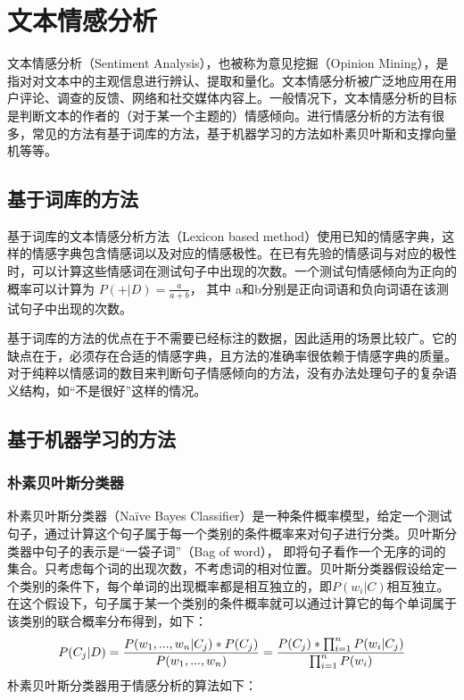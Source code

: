 \chapter{文本情感分析}
文本情感分析（Sentiment Analysis），也被称为意见挖掘（Opinion Mining），是指对对文本中的主观信息进行辨认、提取和量化。文本情感分析被广泛地应用在用户评论、调查的反馈、网络和社交媒体内容上。一般情况下，文本情感分析的目标是判断文本的作者的（对于某一个主题的）情感倾向。进行情感分析的方法有很多，常见的方法有基于词库的方法，基于机器学习的方法如朴素贝叶斯和支撑向量机等等。

\section{基于词库的方法}
基于词库的文本情感分析方法（Lexicon based method）使用已知的情感字典，这样的情感字典包含情感词以及对应的情感极性。在已有先验的情感词与对应的极性时，可以计算这些情感词在测试句子中出现的次数。一个测试句情感倾向为正向的概率可以计算为 $P(+|D)=\frac{a}{a+b}$， 其中 a和b分别是正向词语和负向词语在该测试句子中出现的次数。

基于词库的方法的优点在于不需要已经标注的数据，因此适用的场景比较广。它的缺点在于，必须存在合适的情感字典，且方法的准确率很依赖于情感字典的质量。对于纯粹以情感词的数目来判断句子情感倾向的方法，没有办法处理句子的复杂语义结构，如“不是很好”这样的情况。

\section{基于机器学习的方法}
\subsection{朴素贝叶斯分类器}
朴素贝叶斯分类器（Naïve Bayes Classifier）是一种条件概率模型，给定一个测试句子，通过计算这个句子属于每一个类别的条件概率来对句子进行分类。贝叶斯分类器中句子的表示是“一袋子词”（Bag of word）， 即将句子看作一个无序的词的集合。只考虑每个词的出现次数，不考虑词的相对位置。贝叶斯分类器假设给定一个类别的条件下，每个单词的出现概率都是相互独立的，即$P(w_i|C)$相互独立。在这个假设下，句子属于某一个类别的条件概率就可以通过计算它的每个单词属于该类别的联合概率分布得到，如下：
\begin{equation} \label{eq2.1}
P(C_j|D)=\frac{P(w_1,...,w_n|C_j)*P(C_j)}{P(w_1,...,w_n)}\\
        =\frac{P(C_j)*\prod_{i=1}^{n}P(w_i|C_j)}{\prod_{i=1}^{n}P(w_i)}
\end{equation}
朴素贝叶斯分类器用于情感分析的算法如下：


